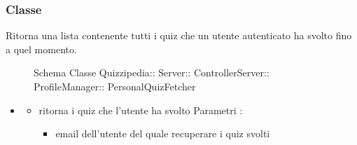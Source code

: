 \subsubsection{Classe }
Ritorna una lista contenente tutti i quiz che un utente autenticato ha svolto fino a quel momento.
\begin{figure}[H]
\centering
\noindent{}
\caption[Schema Classe PersonalQuizFetcher]{Schema Classe Quizzipedia:: Server:: ControllerServer:: ProfileManager:: PersonalQuizFetcher}
\end{figure}
\begin{itemize}
\item {}
\begin{itemize}
\item {}
\newline
ritorna i quiz che l'utente ha svolto
\newline
Parametri :
\begin{itemize}
\item {}
\newline
email dell'utente del quale recuperare i quiz svolti
\end{itemize}
\end{itemize}
\end{itemize}
